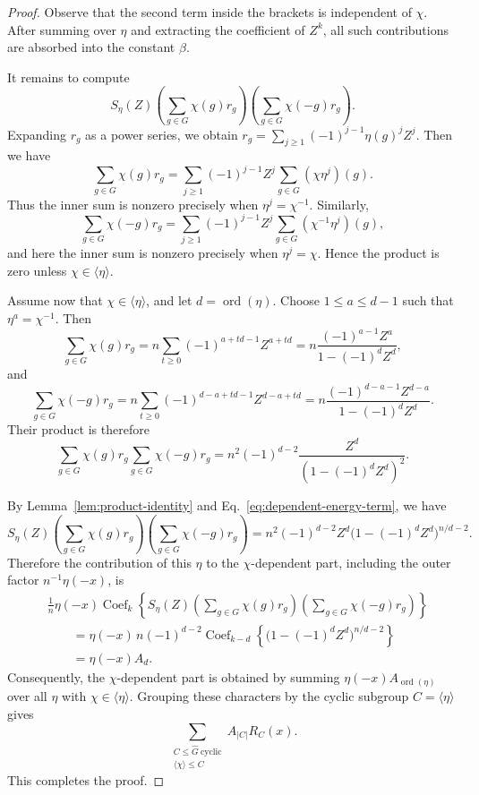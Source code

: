 \documentclass[11pt]{article}
\theoremstyle{definition}
\DeclareMathOperator{\ord}{ord}
\begin{document}
\begin{proof}
Observe that the second term inside the brackets is independent of \(\chi\). After summing over \(\eta\) and extracting the coefficient of \(Z^k\), all such contributions are absorbed into the constant \(\beta\).

It remains to compute
\[
S_\eta(Z)
\left(\sum_{g\in G}\chi(g)r_g\right)
\left(\sum_{g\in G}\chi(-g)r_g\right).
\]
Expanding \(r_g\) as a power series, we obtain $r_g=\sum_{j\ge1}(-1)^{j-1}\eta(g)^j Z^j$.
Then we have
\[
\sum_{g\in G}\chi(g)r_g
=
\sum_{j\ge1}(-1)^{j-1}Z^j
\sum_{g\in G}(\chi\eta^j)(g).
\]
Thus the inner sum is nonzero precisely when \(\eta^j=\chi^{-1}\).
Similarly,
\[
\sum_{g\in G}\chi(-g)r_g
=
\sum_{j\ge1}(-1)^{j-1}Z^j
\sum_{g\in G}(\chi^{-1}\eta^j)(g),
\]
and here the inner sum is nonzero precisely when \(\eta^j=\chi\).
Hence the product is zero unless \(\chi\in\langle\eta\rangle\).

Assume now that \(\chi\in\langle\eta\rangle\), and let
\(d=\ord(\eta)\). Choose \(1\le a\le d-1\) such that
\(\eta^a=\chi^{-1}\). Then
\[
\sum_{g\in G}\chi(g)r_g
=
n\sum_{t\ge0}(-1)^{a+td-1}Z^{a+td}
=
n\frac{(-1)^{a-1}Z^a}{1-(-1)^d Z^d},
\]
and
\[
\sum_{g\in G}\chi(-g)r_g
=
n\sum_{t\ge0}(-1)^{d-a+td-1}Z^{d-a+td}
=
n\frac{(-1)^{d-a-1}Z^{d-a}}{1-(-1)^d Z^d}.
\]
Their product is therefore
\begin{equation}\label{eq:dependent-energy-term}
\sum_{g\in G}\chi(g)r_g
\sum_{g\in G}\chi(-g)r_g=n^2(-1)^{d-2}\frac{Z^d}{(1-(-1)^d Z^d)^2}.
\end{equation}

By Lemma~\ref{lem:product-identity} and Eq.~\eqref{eq:dependent-energy-term}, we have
\[
S_\eta(Z)
\left(\sum_{g\in G}\chi(g)r_g\right)
\left(\sum_{g\in G}\chi(-g)r_g\right)=n^2(-1)^{d-2}Z^d
\bigl(1-(-1)^d Z^d\bigr)^{n/d-2}.
\]
Therefore the contribution of this \(\eta\) to the \(\chi\)-dependent
part, including the outer factor \(n^{-1}\eta(-x)\), is
\[
\begin{aligned}
	&\frac{1}{n}\eta(-x)\operatorname{Coef}_{k}\left\{S_\eta(Z)
	\left(\sum_{g\in G}\chi(g)r_g\right)
	\left(\sum_{g\in G}\chi(-g)r_g\right)\right\} \\
	&\qquad
	=\eta(-x)\,n(-1)^{d-2}
	\operatorname{Coef}_{k-d}\left\{
	\bigl(1-(-1)^dZ^d\bigr)^{n/d-2}\right\} \\
	&\qquad
	=\eta(-x)A_d.
\end{aligned}
\]
Consequently, the $\chi$-dependent part is obtained by summing $\eta(-x)A_{\ord(\eta)}$ over all $\eta$ with $\chi\in\langle\eta\rangle$. Grouping these characters by the cyclic subgroup $C=\langle\eta\rangle$ gives
\[
\sum_{\substack{C\le\widehat G\ \mathrm{cyclic}\\
		\langle\chi\rangle\le C}}
A_{|C|}R_C(x).
\]
This completes the proof.
\end{proof}
\end{document}
